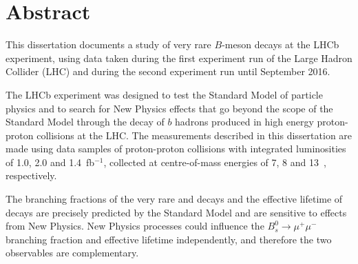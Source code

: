 \chapter{Abstract}

This dissertation documents a study of very rare $B$-meson decays at the LHCb experiment, using data taken during the first experiment run of the Large Hadron Collider (LHC) and during the second experiment run until September 2016.



The LHCb experiment was designed to test the Standard Model of particle physics and to search for New Physics effects that go beyond the scope of the Standard Model through the decay of $b$ hadrons produced in high energy proton-proton collisions at the LHC. The measurements described in this dissertation are made using data samples of proton-proton collisions with integrated luminosities of 1.0, 2.0 and 1.4~fb$^{-1}$, collected at centre-of-mass energies of 7, 8 and 13~\tev, respectively. %

The branching fractions of the very rare \bdmumu and \bsmumu decays and the effective lifetime of \bsmumu decays are precisely predicted by the Standard Model and are sensitive to effects from New Physics. 
New Physics processes could influence the $B_{s}^{0} \to \mu^{+} \mu^{-}$  branching fraction and effective lifetime independently, and therefore the two observables are complementary. %





